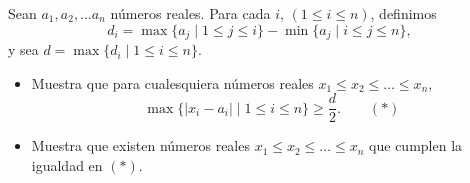 Sean $a_1, a_2, \dots a_n$ números reales. Para cada $i$, $ (1 \leq i \leq n )$, definimos 
\[ d_{i} = \max \{ a_{j}\mid 1 \leq j \leq i \} - \min \{ a_{j}\mid i \leq j \leq n \}, \]
y sea $d = \max \{d_{i}\mid 1 \leq i \leq n \}$.
 \begin{itemize} 
 \item  Muestra que para cualesquiera números reales $x_1\leq x_2\leq\dots\leq x_n$, 
\[ \max \{ |x_{i} - a_{i}| \mid 1 \leq i \leq n \}\geq \frac {d}{2}. \quad \quad (*) \]
 \item  Muestra que existen números reales $x_1\leq x_2\leq\dots\leq x_n$ que cumplen la igualdad en $(*)$.
 \end{itemize} 